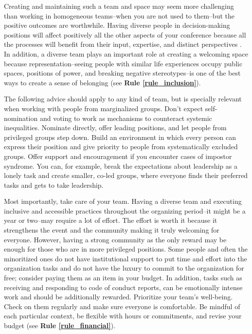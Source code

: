 \documentclass[10pt,letterpaper]{article}
\begin{document}
Creating and maintaining such a team and space may seem more challenging than working in homogeneous teams--when you are not used to them--but the positive outcomes are worthwhile. 
Having diverse people in decision-making positions will affect positively all the other aspects of your conference because all the processes will benefit from their input, expertise, and distinct perspectives \cite{hongGroupsDiverseProblem2004}. 
In addition, a diverse team plays an important role at creating a welcoming space because representation--seeing people with similar life experiences occupy public spaces, positions of power, and breaking negative stereotypes--is one of the best ways to create a sense of belonging (see \textbf{Rule \ref{rule_inclusion}}). 

The following advice should apply to any kind of team, but is specially relevant when working with people from marginalized groups. 
Don't expect self-nomination and voting to work as mechanisms to counteract systemic inequalities. Nominate directly, offer leading positions, and let people from privileged groups step down. 
Build an environment in which every person can express their position and give priority to people from systematically excluded groups.
Offer support and encouragement if you encounter cases of impostor syndrome. 
You can, for example, break the expectations about leadership as a lonely task and create smaller, co-led groups, where everyone finds their preferred tasks and gets to take leadership. 

Most importantly, take care of your team. 
Having a diverse team and executing inclusive and accessible practices throughout the organizing period--it might be a year or two--may require a lot of effort. 
The effort is worth it because it strengthens the event and the community making it truly welcoming for everyone. 
However, having a strong community as the only reward may be enough for those who are in more privileged positions. 
Some people and often the minoritized ones do not have institutional support to put time and effort into the organization tasks and do not have the luxury to commit to the organization for free; consider paying them as an item in your budget.  
In addition, tasks such as receiving and responding to code of conduct reports, can be emotionally intense work and should be additionally rewarded.
Prioritize your team's well-being. Check on them regularly and make sure everyone is comfortable. 
Be mindful of each particular context, be flexible with hours or commitments, and revise your budget (see \textbf{Rule \ref{rule_financial}}). 
\end{document}

